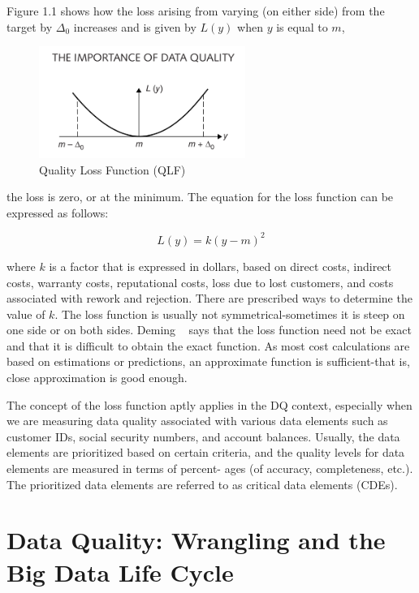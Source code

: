 Figure 1.1 shows how the loss arising from varying (on either side)
from the target by $\Delta_0$ increases and is given by $L(y)$ when $y$ is equal to $m$,

\begin{figure}[htbp!] 
\centering    
\includegraphics[width=0.6\textwidth]{quality-loss-function}
\caption{Quality Loss Function (QLF)}
\end{figure}

the loss is zero, or at the minimum. The equation for the loss function can
be expressed as follows:

\begin{equation*}
    L(y) = k(y-m)^2
\end{equation*}

where $k$ is a factor that is expressed in dollars, based on direct costs, indirect costs, 
warranty costs, reputational costs, loss due to lost customers,
and costs associated with rework and rejection. There are prescribed ways
to determine the value of $k$.
The loss function is usually not symmetrical-sometimes it is steep on
one side or on both sides. Deming ~\citep{Deming} says that the loss function need
not be exact and that it is difficult to obtain the exact function. As most
cost calculations are based on estimations or predictions, an approximate
function is sufficient-that is, close approximation is good enough.

The concept of the loss function aptly applies in the DQ context, especially when we are measuring data quality associated with various data
elements such as customer IDs, social security numbers, and account balances. Usually, the data elements are prioritized based on certain criteria,
and the quality levels for data elements are measured in terms of percent-
ages (of accuracy, completeness, etc.). The prioritized data elements are
referred to as critical data elements (CDEs).


\section{Data Quality: Wrangling and the Big Data Life Cycle}

